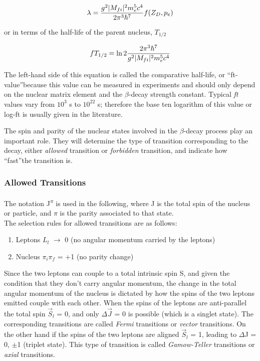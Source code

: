 \begin{equation}
\lambda = \frac{g^2 |M_{fi}|\textsuperscript{2} m_{e}^5c^4}{2\pi^3\hbar^7}f(Z_{D},p_{e}) 
\end{equation}

or in terms of the half-life of the parent nucleus, $T_{1/2}$ 

\begin{equation}
fT_{1/2}= \ln2\frac{2\pi^3\hbar^7}{g^2 |M_{fi}|\textsuperscript{2} m_{e}^5c^4}
\end{equation}

The left-hand side of this equation is called the comparative half-life, or \textquotedblleft ft-value\textquotedblright   because this value can be measured in experiments and should only depend on the nuclear matrix element and the $\beta$-decay strength constant. Typical \textit{ft} values vary from $10^{3}$ s to $10^{22}$ s; therefore the base ten logarithm of this value or log-ft is usually given in the literature. 

The spin and parity of the nuclear states involved in the $\beta$-decay process play an important role. They will determine the type of transition corresponding to the decay, either \textit{allowed} transition or \textit{forbidden} transition, and indicate how \textquotedblleft fast\textquotedblright the transition is.

\subsubsection{Allowed Transitions}

The notation J\textsuperscript{$\pi$} is used in the following, where J is the total spin of the nucleus or particle, and $\pi$ is the parity associated to that state.\\ The selection rules for allowed transitions are as follows:
\begin{enumerate}
	\item Leptons  $L_{l}$   $\rightarrow$ 0 (no angular momentum carried by the leptons)
	\item Nucleus $\pi_{i}\pi_{f}$ = +1 (no parity change)
\end{enumerate}

Since the two leptons can couple to a total intrinsic spin S, and given the condition that they don’t carry angular momentum, the change in the total angular momentum of the nucleus is dictated by how the spins of the two leptons emitted couple with each other. When the spins of the leptons are anti-parallel the total spin $\vec{S}_{l}$ = 0, and only $\Delta\vec{J}$ = 0 is possible (which is a singlet state). The corresponding transitions are called \textit{Fermi} transitions or \textit{vector} transitions. On the other hand if the spins of the two leptons are aligned $\vec{S}_{l}$ = 1, leading to $\Delta$J = 0, $\pm$1 (triplet state). This type of transition is called \textit{Gamow-Teller} transitions or \textit{axial} transitions. 
\\

